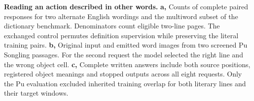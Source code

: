 \textbf{Reading an action described in other words.} \textbf{a,} Counts of complete paired responses for two alternate English wordings and the multiword subset of the dictionary benchmark. Denominators count eligible two-line pages. The exchanged control permutes definition supervision while preserving the literal training pairs. \textbf{b,} Original input and emitted word images from two screened Pu Songling passages. For the second request the model selected the right line and the wrong object cell. \textbf{c,} Complete written answers include both source positions, registered object meanings and stopped outputs across all eight requests. Only the Pu evaluation excluded inherited training overlap for both literary lines and their target windows.
